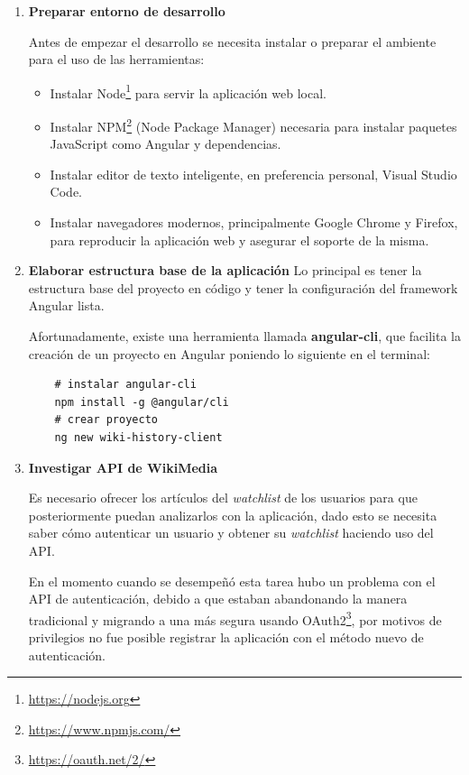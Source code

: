 \begin{enumerate}
  \smallbreak
  \item\textbf{Preparar entorno de desarrollo}
  \smallbreak

  Antes de empezar el desarrollo se necesita instalar o preparar el ambiente para el uso de las herramientas:
  \begin{itemize}
      \item Instalar Node\footnote{\url{https://nodejs.org}} para servir la aplicación web local.
      \item Instalar NPM\footnote{\url{https://www.npmjs.com/}} (Node Package Manager) necesaria para instalar paquetes JavaScript como Angular y dependencias.
      \item Instalar editor de texto inteligente, en preferencia personal, Visual Studio Code.
      \item Instalar navegadores modernos, principalmente Google Chrome y Firefox, para reproducir la aplicación web y asegurar el soporte de la misma.
  \end{itemize}

  \smallbreak
  \item\textbf{Elaborar estructura base de la aplicación}
  \smallbreak
  Lo principal es tener la estructura base del proyecto en código y tener la configuración del framework Angular lista.
  
  Afortunadamente, existe una herramienta llamada \textbf{angular-cli}, que facilita la creación de un proyecto en Angular poniendo lo siguiente en el terminal:
  \begin{verbatim}
    # instalar angular-cli
    npm install -g @angular/cli
    # crear proyecto
    ng new wiki-history-client
  \end{verbatim}

  \smallbreak
  \item\textbf{Investigar API de WikiMedia}
  \smallbreak
  
  Es necesario ofrecer los artículos del \textit{watchlist} de los usuarios para que posteriormente puedan analizarlos con la aplicación, dado esto se necesita saber cómo autenticar un usuario y obtener su \textit{watchlist} haciendo uso del API.
  
  En el momento cuando se desempeñó esta tarea hubo un problema con el API de autenticación, debido a que estaban abandonando la manera tradicional y migrando a una más segura usando OAuth2\footnote{\url{https://oauth.net/2/}}, por motivos de privilegios no fue posible registrar la aplicación con el método nuevo de autenticación.
  

\end{enumerate}
